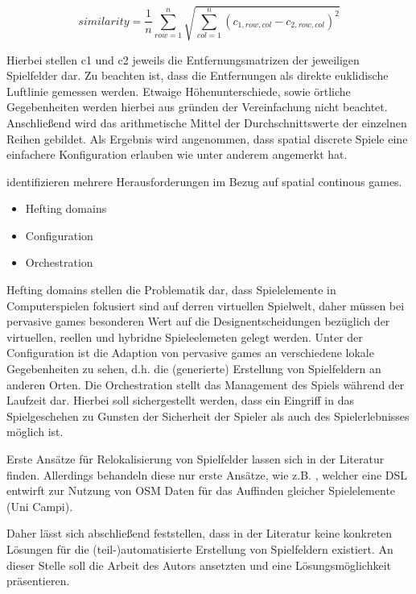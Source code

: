 \begin{equation}
similarity = \frac{1}{n} \sum_{row=1}^{n} \sqrt{ \sum_{col=1}^{n} (c_{1,row,col} - c_{2,row,col})^2 }
\end{equation}

Hierbei stellen c1 und c2 jeweils die Entfernungsmatrizen der jeweiligen Spielfelder dar.
Zu beachten ist, dass die Entfernungen als direkte euklidische Luftlinie gemessen werden. Etwaige Höhenunterschiede, sowie örtliche Gegebenheiten werden hierbei aus gründen der Vereinfachung nicht beachtet. Anschließend wird das arithmetische Mittel der Durchschnittswerte der einzelnen Reihen gebildet.
Als Ergebnis wird angenommen, dass spatial discrete Spiele eine einfachere Konfiguration erlauben wie unter anderem \cite{Benford.2005} angemerkt hat.

\citep{Benford.2005} identifizieren mehrere Herausforderungen im Bezug auf spatial continous games.

\begin{itemize}
      \item Hefting domains
      \item Configuration
      \item Orchestration
\end{itemize}

Hefting domains stellen die Problematik dar, dass Spielelemente in Computerspielen fokusiert sind auf derren virtuellen Spielwelt, daher müssen bei pervasive games besonderen Wert auf die Designentscheidungen bezüglich der virtuellen, reellen und hybridne Spieleelemeten gelegt werden.
Unter der Configuration ist die Adaption von pervasive games an verschiedene lokale Gegebenheiten zu sehen, d.h. die (generierte) Erstellung von Spielfeldern an anderen Orten.
Die Orchestration stellt das Management des Spiels während der Laufzeit dar. Hierbei soll sichergestellt werden, dass ein Eingriff in das Spielgeschehen zu Gunsten der Sicherheit der Spieler als auch des Spielerlebnisses möglich ist.

Erste Ansätze für Relokalisierung von Spielfelder lassen sich in der Literatur finden. Allerdings behandeln diese nur erste Ansätze, wie z.B. \citep{Mannara.2012}, welcher eine DSL entwirft zur Nutzung von OSM Daten für das Auffinden gleicher Spielelemente (Uni Campi).

Daher lässt sich abschließend feststellen, dass in der Literatur keine konkreten Lösungen für die (teil-)automatisierte Erstellung von Spielfeldern existiert.
An dieser Stelle soll die Arbeit des Autors ansetzten und eine Lösungsmöglichkeit präsentieren.

